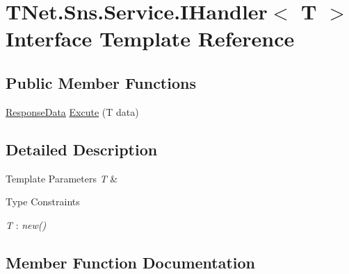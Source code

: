 \hypertarget{interface_t_net_1_1_sns_1_1_service_1_1_i_handler}{}\section{T\+Net.\+Sns.\+Service.\+I\+Handler$<$ T $>$ Interface Template Reference}
\label{interface_t_net_1_1_sns_1_1_service_1_1_i_handler}


 


\subsection*{Public Member Functions}
\begin{DoxyCompactItemize}
\item 
\mbox{\hyperlink{class_t_net_1_1_sns_1_1_service_1_1_response_data}{Response\+Data}} \mbox{\hyperlink{interface_t_net_1_1_sns_1_1_service_1_1_i_handler_a309f90e468664c417ec71239b7be2f9c}{Excute}} (T data)
\end{DoxyCompactItemize}


\subsection{Detailed Description}



\begin{DoxyTemplParams}{Template Parameters}
{\em T} & \\
\hline
\end{DoxyTemplParams}
\begin{Desc}
\item[Type Constraints]\begin{description}
\item[{\em T} : {\em new()}]\end{description}
\end{Desc}


\subsection{Member Function Documentation}
\mbox{\label{interface_t_net_1_1_sns_1_1_service_1_1_i_handler_a309f90e468664c417ec71239b7be2f9c}} 
